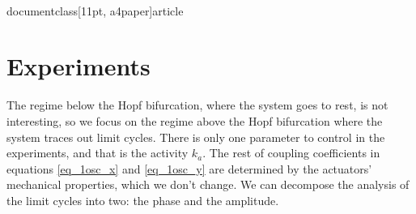 \\documentclass[11pt, a4paper]{article} %
\begin{document}




    \section{Experiments}

    The regime below the Hopf bifurcation, where the system goes to rest, is not interesting, so we focus on the regime 
    above the Hopf bifurcation where the system traces out limit cycles. There is only one parameter to control in the experiments, 
    and that is the activity $k_a$. The rest of coupling coefficients in equations \eqref{eq_1osc_x} and \eqref{eq_1osc_y} are 
    determined by the actuators' mechanical properties, which we don't change. We can decompose the analysis of the limit cycles into two: 
    the phase and the amplitude. 
\end{document}
